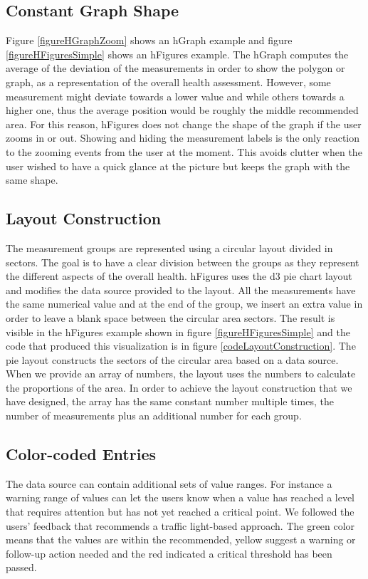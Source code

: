 \documentclass[twocolumn]{bmcart}%
\begin{document}
\subsection*{Constant Graph Shape}

Figure \ref{figureHGraphZoom} shows an hGraph example and figure \ref{figureHFiguresSimple} shows an hFigures example. The hGraph computes the average of the deviation of the measurements in order to show the polygon or graph, as a representation of the overall health assessment. However, some measurement might deviate towards a lower value and while others towards a higher one, thus the average position would be roughly the middle recommended area. For this reason, hFigures does not change the shape of the graph if the user zooms in or out. Showing and hiding the measurement labels is the only reaction to the zooming events from the user at the moment. This avoids clutter when the user wished to have a quick glance at the picture but keeps the graph with the same shape.

\subsection*{Layout Construction}

The measurement groups are represented using a circular layout divided in sectors. The goal is to have a clear division between the groups as they represent the different aspects of the overall health. hFigures uses the d3 pie chart layout and modifies the data source provided to the layout. All the measurements have the same numerical value and at the end of the group, we insert an extra value in order to leave a blank space between the circular area sectors. The result is visible in the hFigures example shown in figure \ref{figureHFiguresSimple} and the code that produced this visualization is in figure \ref{codeLayoutConstruction}. The pie layout constructs the sectors of the circular area based on a data source. When we provide an array of numbers, the layout uses the numbers to calculate the proportions of the area. In order to achieve the layout construction that we have designed, the array has the same constant number multiple times, the number of measurements plus an additional number for each group. 

\subsection*{Color-coded Entries}

The data source can contain additional sets of value ranges. For instance a warning range of values can let the users know when a value has reached a level that requires attention but has not yet reached a critical point. We followed the users' feedback that recommends a traffic light-based approach. The green color means that the values are within the recommended, yellow suggest a warning or follow-up action needed and the red indicated a critical threshold has been passed.
\end{document}
